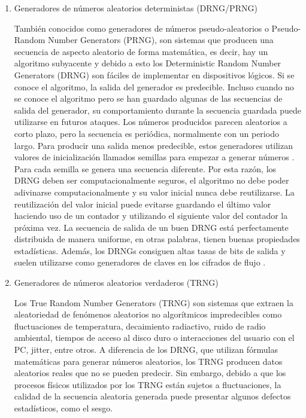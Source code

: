         \begin{enumerate}
            \item Generadores de números aleatorios deterministas (DRNG/PRNG)
            
                También conocidos como generadores de números pseudo-aleatorios o Pseudo-Random Number Generators (PRNG), son sistemas que producen una secuencia de aspecto aleatorio de forma matemática, es decir, hay un algoritmo subyacente y debido a esto los Deterministic Random Number Generators (DRNG) son fáciles de implementar en dispositivos lógicos. Si se conoce el algoritmo, la salida del generador es predecible. Incluso cuando no se conoce el algoritmo pero se han guardado algunas de las secuencias de salida del generador, su comportamiento durante la secuencia guardada puede utilizarse en futuros ataques. Los números producidos parecen aleatorios a corto plazo, pero la secuencia es periódica, normalmente con un periodo largo. Para producir una salida menos predecible, estos generadores utilizan valores de inicialización llamados semillas para empezar a generar números \cite{Nist2010}. Para cada semilla se genera una secuencia diferente. Por esta razón, los DRNG deben ser computacionalmente seguros, el algoritmo no debe poder adivinarse computacionalmente y su valor inicial nunca debe reutilizarse. La reutilización del valor inicial puede evitarse guardando el último valor haciendo uso de un contador y utilizando el siguiente valor del contador la próxima vez. La secuencia de salida de un buen DRNG está perfectamente distribuida de manera uniforme, en otras palabras, tienen buenas propiedades estadísticas. Además, los DRNGs consiguen altas tasas de bits de salida y suelen utilizarse como generadores de claves en los cifrados de flujo \cite{Badrignans2011}.
            
            \item Generadores de números aleatorios verdaderos (TRNG)
            
                Los True Random Number Generators (TRNG) son sistemas que extraen la aleatoriedad de fenómenos aleatorios no algorítmicos impredecibles como fluctuaciones de temperatura, decaimiento radiactivo, ruido de radio ambiental, tiempos de acceso al disco duro o interacciones del usuario con el PC, jitter, entre otros. A diferencia de los DRNG, que utilizan fórmulas matemáticas para generar números aleatorios, los TRNG producen datos aleatorios reales que no se pueden predecir. Sin embargo, debido a que los procesos físicos utilizados por los TRNG están sujetos a fluctuaciones, la calidad de la secuencia aleatoria generada puede presentar algunos defectos estadísticos, como el sesgo.
                

\end{enumerate}
